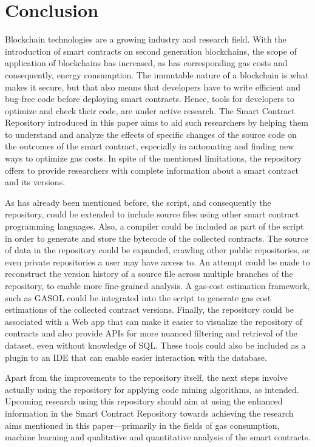 \documentclass[10pt,conference]{IEEEtran}
\begin{document}
	\section{Conclusion}
	\label{sec:conclusion}
	
	Blockchain technologies are a growing industry and research field. With the introduction of smart contracts on second generation blockchains, the scope of application of blockchains has increased, as has corresponding gas costs and consequently, energy consumption. The immutable nature of a blockchain is what makes it secure, but that also means that developers have to write efficient and bug-free code before deploying smart contracts. Hence, tools for developers to optimize and check their code, are under active research. The Smart Contract Repository introduced in this paper aims to aid such researchers by helping them to understand and analyze the effects of specific changes of the source code on the outcomes of the smart contract, especially in automating and finding new ways to optimize gas costs. In spite of the mentioned limitations, the repository offers to provide researchers with complete information about a smart contract and its versions.
	
	As has already been mentioned before, the script, and consequently the repository, could be extended to include source files using other smart contract programming languages. Also, a compiler could be included as part of the script in order to generate and store the bytecode of the collected contracts. The source of data in the repository could be expanded, crawling other public repositories, or even private repositories a user may have access to. An attempt could be made to reconstruct the version history of a source file across multiple branches of the repository, to enable more fine-grained analysis. A gas-cost estimation framework, such as GASOL \cite{gasol} could be integrated into the script to generate gas cost estimations of the collected contract versions. Finally, the repository could be associated with a Web app that can make it easier to visualize the repository of contracts and also provide APIs for more nuanced filtering and retrieval of the dataset, even without knowledge of SQL. These tools could also be included as a plugin to an IDE that can enable easier interaction with the database.
	
	Apart from the improvements to the repository itself, the next steps involve actually using the repository for applying code mining algorithms, as intended. Upcoming research using this repository should aim at using the enhanced information in the Smart Contract Repository towards achieving the research aims mentioned in this paper---primarily in the fields of gas consumption, machine learning and qualitative and quantitative analysis of the smart contracts.
	
\end{document}
